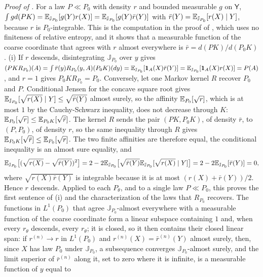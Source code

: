 \noindent\emph{Proof of .}
For a law $P\ll P_0$ with density $r$ and bounded measurable $g$ on $\mathsf Y$,
$\int g d(PK)=\mathbb E_{\mathbb J_{P_0}}[g(Y)r(X)]=\mathbb E_{\mathbb J_{P_0}}[g(Y)\bar r(Y)]$ with
$\bar r(Y)=\mathbb E_{\mathbb J_{P_0}}[r(X)\mid Y]$, because $r$ is $P_0$-integrable. This is the
computation in the proof of , which uses no finiteness of relative entropy,
and it shows that a measurable function of the coarse coordinate that agrees with $r$ almost everywhere
is $\bar r=d(PK)/d(P_0K)$. (i) If $r$ descends, disintegrating $\mathbb J_{P_0}$ over $y$ gives
$(PKR_{P_0})(A)=\int\bar r(y)R_{P_0}(y,A)(P_0K)(dy)=\mathbb E_{\mathbb J_{P_0}}[\mathbf 1_A(X)\bar r(Y)]
=\mathbb E_{\mathbb J_{P_0}}[\mathbf 1_A(X)r(X)]=P(A)$, and $r=1$ gives $P_0KR_{P_0}=P_0$. Conversely, let one
Markov kernel $R$ recover $P_0$ and $P$. Conditional Jensen for the concave square root gives
$\mathbb E_{\mathbb J_{P_0}}[\sqrt{r(X)}\mid Y]\leq\sqrt{\bar r(Y)}$ almost surely, so the affinity
$\mathbb E_{P_0}[\sqrt r]$, which is at most $1$ by the Cauchy-Schwarz inequality, does not decrease through
$K$: $\mathbb E_{P_0}[\sqrt r]\leq\mathbb E_{P_0K}[\sqrt{\bar r}]$. The kernel $R$ sends the pair $(PK,P_0K)$, of density
$\bar r$, to $(P,P_0)$, of density $r$, so the same inequality through $R$ gives
$\mathbb E_{P_0K}[\sqrt{\bar r}]\leq\mathbb E_{P_0}[\sqrt r]$. The two finite affinities are therefore equal, the
conditional inequality is an almost sure equality, and
\begin{equation*}
\mathbb E_{\mathbb J_{P_0}}\bigl[(\sqrt{r(X)}-\sqrt{\bar r(Y)})^2\bigr]
=2-2\mathbb E_{\mathbb J_{P_0}}\bigl[\sqrt{\bar r(Y)}\mathbb E_{\mathbb J_{P_0}}[\sqrt{r(X)}\mid Y]\bigr]
=2-2\mathbb E_{\mathbb J_{P_0}}[\bar r(Y)]=0,
\end{equation*}
where $\sqrt{r(X)\bar r(Y)}$ is integrable because it is at most $(r(X)+\bar r(Y))/2$. Hence $r$
descends. Applied to each $P_\theta$, and to a single law $P\ll P_0$, this proves the first sentence of
(i) and the characterization of the laws that $R_{P_0}$ recovers. The functions in $L^1(P_0)$ that
agree $\mathbb J_{P_0}$-almost everywhere with a measurable function of the coarse coordinate form a
linear subspace containing $1$ and, when every $r_\theta$ descends, every $r_\theta$; it is closed, so
it then contains their closed linear span: if $r^{(n)}\to r$ in $L^1(P_0)$ and $r^{(n)}(X)=\bar r^{(n)}(Y)$ almost surely, then, since $X$
has law $P_0$ under
$\mathbb J_{P_0}$, a subsequence converges $\mathbb J_{P_0}$-almost surely, and the limit superior of
$\bar r^{(n)}$ along it, set to zero where it is infinite, is a measurable function of $y$ equal to
